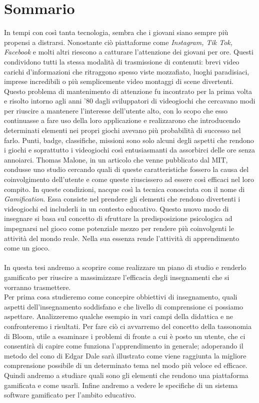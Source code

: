 \chapter*{Sommario}
\label{sommario}


In tempi con così tanta tecnologia, sembra che i giovani siano sempre più propensi a distrarsi. Nonostante ciò piattaforme come \textit{Instagram, Tik Tok, Facebook} e molti altri riescono a catturare l'attenzione dei giovani per ore. Questi condividono tutti la stessa modalità di trasmissione di contenuti: brevi video carichi d'informazioni che ritraggono spesso viste mozzafiato, luoghi paradisiaci, imprese incredibili o più semplicemente video montaggi di scene divertenti.
Questo problema di mantenimento di attenzione fu incontrato per la prima volta e risolto intorno agli anni '80 dagli sviluppatori di videogiochi che cercavano modi per riuscire a mantenere l'interesse dell'utente alto, con lo scopo che esso continuasse a fare uso della loro applicazione e realizzarono che introducendo determinati elementi nei propri giochi avevano più probabilità di successo nel farlo. Punti, badge, classifiche, missioni sono solo alcuni degli aspetti che rendono i giochi e soprattutto i videogiochi così entusiasmanti da assorbirci delle ore senza annoiarci.
Thomas Malone, in un articolo che venne pubblicato dal MIT, condusse uno studio cercando quali di queste caratteristiche fossero la causa del coinvolgimento dell'utente e come queste riuscissero ad essere così efficaci nel loro compito. In queste condizioni, nacque così la tecnica conosciuta con il nome di \textit{Gamification}. Essa consiste nel prendere gli elementi che rendono divertenti i videogiochi ed includerli in un contesto educativo. Questo nuovo modo di insegnare si basa sul concetto di sfruttare la predisposizione psicologica ad impegnarsi nel gioco come potenziale mezzo per rendere più coinvolgenti le attività del mondo reale. Nella sua essenza rende l'attività di apprendimento come un gioco.\\
\\
In questa tesi andremo a scoprire come realizzare un piano di studio e renderlo gamificato per riuscire a massimizzare l'efficacia degli insegnamenti che si vorranno trasmettere.\\
Per prima cosa studieremo come concepire obbiettivi di insegnamento, quali aspetti dell'insegnamento soddisfano e che livello di comprensione ci possiamo aspettare. Analizzeremo qualche esempio in vari campi della didattica e ne confronteremo i risultati. Per fare ciò ci avvarremo del concetto della tassonomia di Bloom, utile a esaminare i problemi di fronte a cui è posto un utente, che ci consentirà di capire come funziona l'apprendimento in generale; adoperando il metodo del cono di Edgar Dale sarà illustrato come viene raggiunta la migliore comprensione possibile di un determinato tema nel modo più veloce ed efficace. Quindi andremo a studiare quali sono gli elementi che rendono una piattaforma gamificata e come usarli. Infine andremo a vedere le specifiche di un sistema software gamificato per l'ambito educativo.
\\
\\
\\
\\
\\
\\
\\
\\
\\
\\
